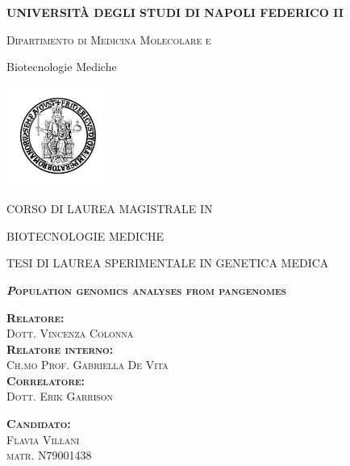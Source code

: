\documentclass[
11pt, %
oneside, %
english, %
singlespacing, %
headsepline, %
chapterinoneline, %
]{MastersDoctoralThesis} %
\author{Flavia Villani, Vincenza Colonna}
\date{1 June 2020}
\begin{document}
\begin{titlepage}
\centering
{\scshape\large\normalfont\bfseries UNIVERSITÀ DEGLI STUDI DI NAPOLI FEDERICO II \par}
 \vspace{0.7cm} 
{\scshape\large\normalfont Dipartimento di Medicina Molecolare e 

Biotecnologie Mediche
 \vspace{0.7cm} 
 
 
 \includegraphics[width=0.25\textwidth]{fig/logo.png}
 \par
 \vspace{0.5cm}
\hspace{2cm}
 \par}
 \vspace{0.2cm}
{\scshape\large\normalfont CORSO DI LAUREA MAGISTRALE IN 

BIOTECNOLOGIE MEDICHE
 \par}
 \vspace{0.5cm} 
{\scshape\large\normalfont TESI DI LAUREA SPERIMENTALE IN GENETICA MEDICA
 \par}
  \vspace{0.5cm}

{\scshape\large\normalfont\bfseries\textit Population genomics analyses from pangenomes
 \par}  


\vspace{1cm} 
\begin{minipage}{0.45\textwidth}
{\scshape\normalfont\large\bfseries Relatore:}\\
{\scshape\normalfont\large Dott. Vincenza Colonna} \\ 
{\scshape\normalfont\large\bfseries Relatore interno:} \\
{\scshape\normalfont\large Ch.mo Prof. Gabriella De Vita}\\
{\scshape\normalfont\large\bfseries Correlatore:} \\
{\scshape\normalfont\large Dott. Erik Garrison}
\end{minipage}
\hspace{2.5cm}
\begin{minipage}{0.25\textwidth}
{\scshape\normalfont\large\bfseries Candidato:}\\
 {\scshape\normalfont\large Flavia Villani \\
 matr. N79001438} 
\end{minipage}


\end{titlepage}
\end{document}
